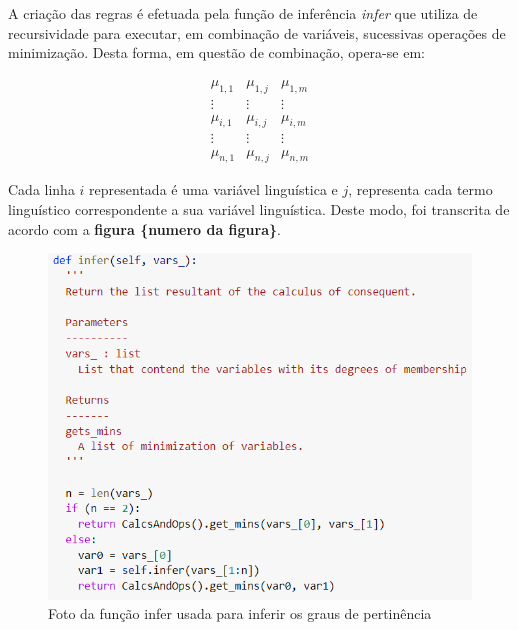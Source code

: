 \documentclass[courier]{uninove-ppgi}
\begin{document}
		     A criação das regras é efetuada pela função de inferência \textit{infer} que utiliza de recursividade para executar, em combinação de variáveis, sucessivas operações de minimização. Desta forma, em questão de combinação, opera-se em:
		     
		     \begin{equation}
                \begin{matrix}
                  \mu_{1,1} & \mu_{1,j} &  \mu_{1,m} \\
                  \vdots & \vdots &  \vdots \\
                  \mu_{i,1} & \mu_{i,j} & \mu_{i,m} \\
                  \vdots &  \vdots & \vdots \\
                  \mu_{n,1} & \mu_{n,j} & \mu_{n,m}
                \end{matrix}
		     \end{equation}
		     
		     Cada linha $i$ representada é uma variável linguística e $j$, representa cada termo linguístico correspondente a sua variável linguística. Deste modo, foi transcrita de acordo com a \textbf{figura \{numero da figura\}}.
		     
		     \begin{figure}[ht!]
    
        	    \begin{center}
        	
        		    \includegraphics[scale=1]{infer}
        	
        	    \end{center}
        	
        	    \caption{Foto da função infer usada para inferir os graus de pertinência}
        	
        	
            \end{figure}
			
\end{document}
